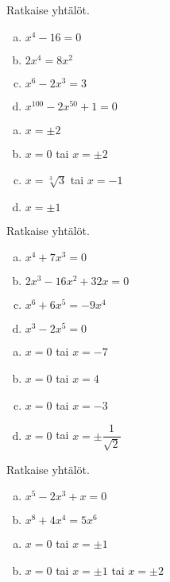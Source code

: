 \begin{tehtavasivu}
\begin{tehtava}
    Ratkaise yhtälöt.
    \begin{enumerate}[a)]
        \item $x^4 - 16 = 0$
        \item $2x^4 = 8x^2$
        \item $x^6 - 2x^3 = 3$
        \item $x^{100} - 2x^{50} + 1 = 0$
    \end{enumerate}
    \begin{vastaus}
        \begin{enumerate}[a)]
            \item $x = \pm2$
            \item $x = 0$ tai $x=\pm2$
            \item $x = \sqrt[3]{3}$ tai $x= -1$
            \item $x = \pm1$
        \end{enumerate}
    \end{vastaus}
\end{tehtava}

\begin{tehtava}
    Ratkaise yhtälöt.
    \begin{enumerate}[a)]
        \item $x^4 + 7x^3 = 0$
        \item $2x^3 - 16x^2 + 32x = 0$
        \item $x^6 + 6x^5 = -9x^4$
        \item $x^3 - 2x^5 = 0$      
    \end{enumerate}
    \begin{vastaus}
        \begin{enumerate}[a)]
        	\item $x = 0$ tai $x = -7$
        	\item $x = 0$ tai $x = 4$
        	\item $x = 0$ tai $x = -3$
            \item $x = 0$ tai $x = \pm\dfrac{1}{\sqrt{2}}$
        \end{enumerate}
    \end{vastaus}
\end{tehtava}

\begin{tehtava}
    Ratkaise yhtälöt.
    \begin{enumerate}[a)]
        \item $x^5 - 2x^3 + x = 0$
        \item $x^8 + 4x^4 = 5x^6$       
    \end{enumerate}
    \begin{vastaus}
        \begin{enumerate}[a)]
        	\item $x = 0$ tai $x = \pm1$
        	\item $x = 0$ tai $x = \pm1$ tai $x = \pm2$
        \end{enumerate}
    \end{vastaus}
\end{tehtava}


\end{tehtavasivu}
